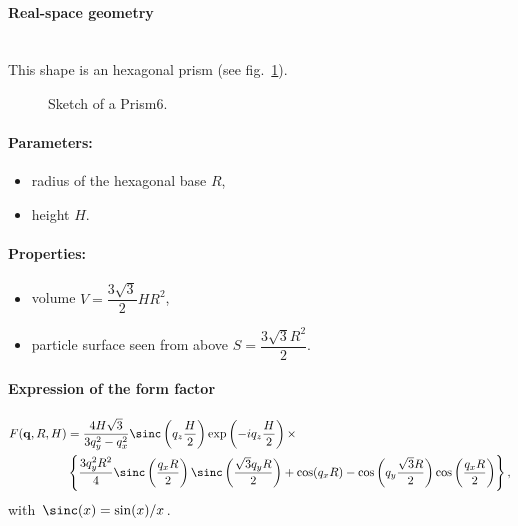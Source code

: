 \paragraph{Real-space geometry}\mbox{}\\
This shape is an hexagonal prism (see fig.~\ref{fig:prism6}).

\begin{figure}[ht]
\hfill
{}
\hfill
{}
\hfill
\caption{Sketch of a Prism6.}
\label{fig:prism6}
\end{figure}

\FloatBarrier

\paragraph{Parameters:}
\begin{itemize}
\item radius of the hexagonal base $R$,
\item height $H$.
\end{itemize}

\paragraph{Properties:}
\begin{itemize}
\item volume $V = \dfrac{3\sqrt{3}}{2}H R^2$,
\item particle surface seen from above $S =\dfrac{3\sqrt{3}R^2}{2}$.
\end{itemize}

\paragraph{Expression of the form factor}
\begin{align*}
F(\mathbf{q}, R, H) &= \frac{4H\sqrt{3}}{3q_y^2 - q_x^2}
\sinc\left(q_z\frac{H}{2}\right) \exp\left(-i q_z\frac{ H}{2}\right)\times\\
&\left\{\frac{3q_y^2R^2}{4} \sinc\left(\frac{q_x
  R}{2}\right)\sinc\left(\frac{\sqrt{3}q_yR }{2}\right)+ \cos(q_x R)-\cos\left(q_y
\frac{\sqrt{3}R}{2}\right) \cos\left(\frac{q_x R}{2}\right)\right\},
\end{align*}
with $\sinc(x)=\sin(x)/x$.

